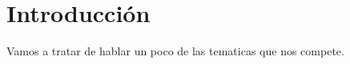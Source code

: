 \documentclass[10pt,a4paper]{beamer}
\author{Luis Alberto Guanuco}
\begin{document}
\maketitle

\section{Introducción}
Vamos a tratar de hablar un poco de las tematicas que nos compete.
\end{document}
